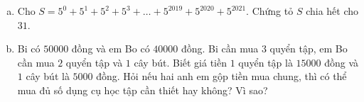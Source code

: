 \begin{ex}
	\begin{enumerate}[a)]
	\item Cho $S=5^{0}+5^{1}+5^{2}+5^{3}+\ldots+5^{2019}+5^{2020}+5^{2021}$. Chứng tỏ $S$ chia hết cho $31$. 
	\item Bi có $50 000$ đồng và em Bo có $40 000$ đồng. Bi cần mua $3$ quyển tập, em Bo cần mua $2$ quyển tập và $1$ cây bút. Biết giá tiền $1$ quyển tập là $15 000$ đồng và $1$ cây bút là $5 000$ đồng. Hỏi nếu hai anh em gộp tiền mua chung, thì có thể mua đủ số dụng cụ học tập cần thiết hay không? Vì sao?
	\end{enumerate}
\end{ex}